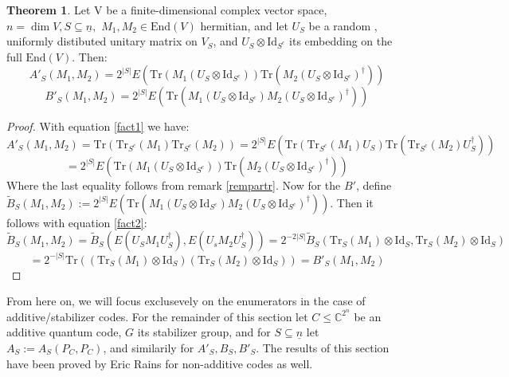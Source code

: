 \documentclass{article}
\def\C{\mathbb{C}}
\def\n{\underline{n}}
\def\End{\text{End}}
\def\Tr{\text{Tr}}
\def\Id{\text{Id}}
\newenvironment{bew}{\begin{proof}[Proof]}{\end{proof}}
\theoremstyle{definition}
\newtheorem{theorem}[Satz]{Theorem}
\begin{document}
\begin{theorem}\label{expectedvalues}%
Let V be a finite-dimensional complex vector space, $n = \dim V, S \subseteq \n,$ $M_1, M_2 \in \End(V)$ hermitian, and let $U_S$ be a random , uniformly distibuted unitary matrix on $V_S$, and $U_S \otimes \Id_{S^c}$ its embedding on the full $\End(V)$. Then:
\begin{equation} A'_S(M_1,M_2) = 2^{|S|} E( \Tr(M_1 (U_S \otimes \Id_{S^c})) \Tr(M_2 (U_S \otimes \Id_{S^c})^\dagger )) \end{equation}
\begin{equation} B'_S(M_1,M_2) = 2^{|S|} E( \Tr(M_1 (U_S \otimes \Id_{S^c}) M_2 (U_S \otimes \Id_{S^c})^\dagger)) \end{equation}
\begin{bew}
With equation \ref{fact1} we have: \begin{equation*} A'_S(M_1, M_2) = \Tr(\Tr_{S^c}(M_1)\Tr_{S^c}(M_2)) = 2^{|S|} E(\Tr(\Tr_{S^c}(M_1) U_S) \Tr( \Tr_{S^c}(M_2) U_S^\dagger)) \end{equation*} \begin{equation*} = 2^{|S|} E(\Tr(M_1 (U_S \otimes \Id_{S^c})) \Tr(M_2 (U_S \otimes \Id_{S^c})^\dagger)) \end{equation*} 
Where the last equality follows from remark \ref{rempartr}.
Now for the $B'$, define $\tilde B_S(M_1, M_2) :=   2^{|S|} E( \Tr(M_1 (U_S \otimes \Id_{S^c}) M_2 (U_S \otimes \Id_{S^c})^\dagger))$. Then it follows with equation \ref{fact2}: 
\begin{equation*}
\tilde B_S(M_1,M_2) = \tilde B_S( E(U_S M_1 U_S^\dagger), E(U_s M_2 U_S^\dagger)) = 2^{-2|S|} \tilde B_S( \Tr_S(M_1) \otimes \Id_S, \Tr_S(M_2) \otimes \Id_S) \end{equation*}
\begin{equation*} = 2^{-|S|} \Tr((\Tr_S(M_1) \otimes \Id_S)(\Tr_S(M_2) \otimes \Id_S)) = B'_S(M_1,M_2)\end{equation*}
\end{bew}
\end{theorem}



From here on, we will focus exclusevely on the enumerators in the case of additive/stabilizer codes. For the remainder of this section let $C \leq \C^{2^n}$ be an additive quantum code, $G$ its stabilizer group, and for $S \subseteq \n$ let $A_S:= A_S(P_C,P_C)$, and similarily for $A'_S, B_S, B'_S$. The results of this section have been proved by Eric Rains \cite{quantumweightenums} for non-additive codes as well.
\end{document}
